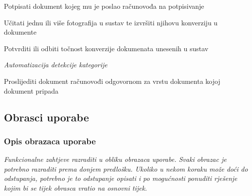 \begin{packed_enum}
				\item  {}
			
				\begin{packed_enum}
					
					\item Potpisati dokument kojeg mu je poslao računovođa na potpisivanje
					\item Učitati jednu ili više fotografija u sustav te izvršiti njihovu konverziju u dokumente
					\item Potvrditi ili odbiti točnost konverzije dokumenata unesenih u sustav
					\item \textit{Automatizacija detekcije kategorije}
					\item Proslijediti dokument računovođi odgovornom za vrstu dokumenta kojoj dokument pripada
					
				\end{packed_enum}
			
			\end{packed_enum}
			
			\eject 
			
			
				
			\subsection{Obrasci uporabe}
					
				\subsubsection{Opis obrazaca uporabe}
					\textit{Funkcionalne zahtjeve razraditi u obliku obrazaca uporabe. Svaki obrazac je potrebno razraditi prema donjem predlošku. Ukoliko u nekom koraku može doći do odstupanja, potrebno je to odstupanje opisati i po mogućnosti ponuditi rješenje kojim bi se tijek obrasca vratio na osnovni tijek.}\\
					

